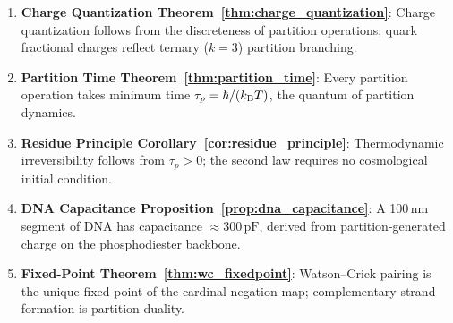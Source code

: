 \begin{chapterbox}[title=Chapter 2 — Key Results Established]
\begin{enumerate}[label=\textbf{\arabic*.}]
  \item \textbf{Charge Quantization Theorem~\ref{thm:charge_quantization}}:
        Charge quantization follows from the discreteness of partition operations;
        quark fractional charges reflect ternary ($k=3$) partition branching.

  \item \textbf{Partition Time Theorem~\ref{thm:partition_time}}:
        Every partition operation takes minimum time $\tau_p = \hbar/(k_{\mathrm{B}} T)$,
        the quantum of partition dynamics.

  \item \textbf{Residue Principle Corollary~\ref{cor:residue_principle}}:
        Thermodynamic irreversibility follows from $\tau_p > 0$; the second law
        requires no cosmological initial condition.

  \item \textbf{DNA Capacitance Proposition~\ref{prop:dna_capacitance}}:
        A 100\,nm segment of DNA has capacitance $\approx 300\,\mathrm{pF}$,
        derived from partition-generated charge on the phosphodiester backbone.

  \item \textbf{Fixed-Point Theorem~\ref{thm:wc_fixedpoint}}:
        Watson--Crick pairing is the unique fixed point of the cardinal negation
        map; complementary strand formation is partition duality.
\end{enumerate}
\end{chapterbox}
